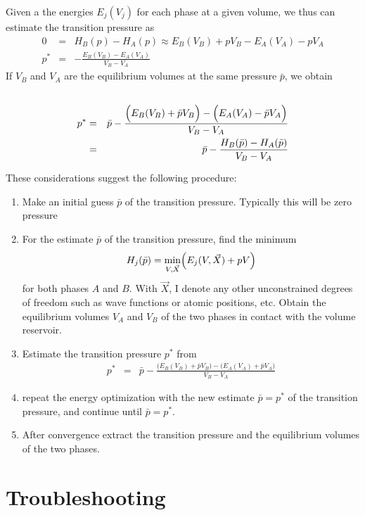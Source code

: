 \documentclass[final,12pt,makeidx,DIV=calc]{article}
\begin{document}
{{{{{{Given a the energies $E_j(V_j)$ for each phase at a given volume, we
thus can estimate the transition pressure as
\begin{eqnarray}
0&=&H_B(p)-H_A(p)\approx E_B(V_B)+pV_B-E_A(V_A)-pV_A
\nonumber\\
p^*&=&-\frac{E_B(V_B)-E_A(V_A)}{V_B-V_A}
\end{eqnarray}
If $V_B$ and $V_A$ are the equilibrium volumes at the same pressure
$\bar{p}$, we obtain
\begin{eqnarray}
\nonumber\\
p^*
&=&\bar{p}
-\frac{\Bigl(E_B(V_B)+\bar{p}V_B\Bigr)-\Bigl(E_A(V_A)-\bar{p}V_A\Bigr)}{V_B-V_A}
\nonumber\\
&=&\bar{p}-\frac{H_B(\bar{p})-H_A(\bar{p})}{V_B-V_A}
\end{eqnarray}

These considerations suggest the following procedure:
\begin{enumerate}
\item Make an initial guess $\bar{p}$ of the transition
  pressure. Typically this will be zero pressure
%
\item For the estimate $\bar{p}$ of the transition pressure, find the
  minimum
\begin{eqnarray}
H_j(\bar{p})=\min_{V,\vec{X}} \Bigl(E_j(V,\vec{X})+pV\Bigr)
\end{eqnarray}
 for both
  phases $A$ and $B$.  With $\vec{X}$, I denote any other unconstrained
  degrees of freedom such as wave functions or atomic positions, etc.
  Obtain the equilibrium volumes $V_A$ and $V_B$ of the two phases in
  contact with the volume reservoir.
%
\item Estimate the transition pressure $p^*$ from
\begin{eqnarray}
p^*&=&
\bar{p}
-\frac{\bigl(E_B(V_B)+\bar{p}V_B\bigr)-\big(E_A(V_A)+\bar{p}V_A\big)}
{V_B-V_A}
\end{eqnarray}
%
\item repeat the energy optimization with the new estimate
  $\bar{p}=p^*$ of the transition pressure, and continue until
  $\bar{p}=p^*$.
%
\item After convergence extract the transition pressure and the
  equilibrium volumes of the two phases.
\end{enumerate}
\newpage
\section{Troubleshooting}

}}}}}}
\end{document}
